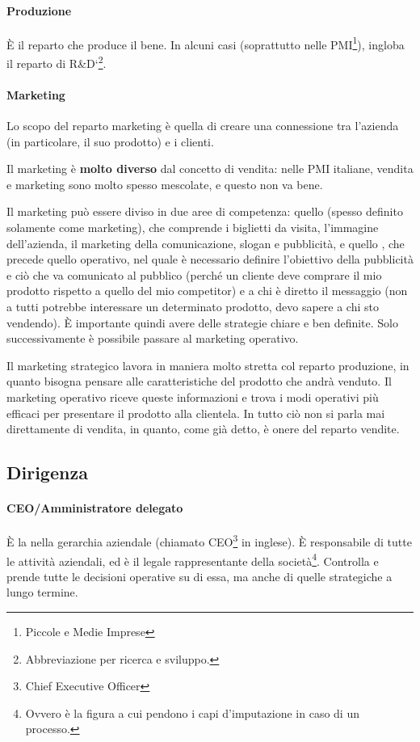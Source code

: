 \paragraph*{Produzione} È il reparto che produce il bene. In alcuni casi
(soprattutto nelle PMI\footnote{Piccole e Medie Imprese}), ingloba il
reparto di R\&D`\footnote{Abbreviazione per ricerca e sviluppo.}.

\paragraph*{Marketing}
\begin{definition}[Marketing]
Lo scopo del reparto marketing è quella di creare una connessione tra l'azienda
(in particolare, il suo prodotto) e i clienti.
\end{definition}

\noindent Il marketing è \textbf{molto diverso} dal concetto di vendita: nelle
PMI italiane, vendita e marketing sono molto spesso mescolate, e questo non va
bene.

Il marketing può essere diviso in due aree di competenza: quello
 (spesso definito solamente come marketing), che comprende
i biglietti da visita, l'immagine dell'azienda, il marketing della
comunicazione, slogan e pubblicità, e quello , che
precede quello operativo, nel quale è necessario definire l'obiettivo della
pubblicità e ciò che va comunicato al pubblico (perché un cliente deve comprare
il mio prodotto rispetto a quello del mio competitor) e a chi è diretto il
messaggio (non a tutti potrebbe interessare un determinato prodotto, devo
sapere a chi sto vendendo). È importante quindi avere delle strategie chiare e
ben definite. Solo successivamente è possibile passare al marketing operativo.

Il marketing strategico lavora in maniera molto stretta col reparto produzione,
in quanto bisogna pensare alle caratteristiche del prodotto che andrà venduto.
Il marketing operativo riceve queste informazioni e trova i modi operativi più
efficaci per presentare il prodotto alla clientela. In tutto ciò non si parla
mai direttamente di vendita, in quanto, come già detto, è onere del reparto
vendite.

\subsection{Dirigenza}

\paragraph*{CEO/Amministratore delegato} È la  nella gerarchia aziendale (chiamato CEO\footnote{Chief Executive
Officer} in inglese). È responsabile di tutte le attività aziendali, ed è il
legale rappresentante della società\footnote{Ovvero è la figura a cui pendono i
capi d'imputazione in caso di un processo.}. Controlla e prende tutte le
decisioni operative su di essa, ma anche di quelle strategiche a lungo
termine.


